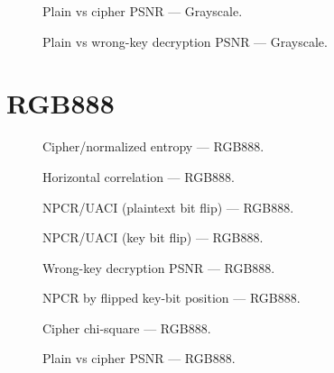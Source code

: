\documentclass{article}
\begin{document}
\begin{figure}[htbp]
  \centering
  
  \caption{Plain vs cipher PSNR --- Grayscale.}
\end{figure}

\begin{figure}[htbp]
  \centering
  
  \caption{Plain vs wrong-key decryption PSNR --- Grayscale.}
\end{figure}

\clearpage

\section{RGB888}
\begin{figure}[htbp]
  \centering
  
  \caption{Cipher/normalized entropy --- RGB888.}
\end{figure}

\begin{figure}[htbp]
  \centering
  
  \caption{Horizontal correlation --- RGB888.}
\end{figure}

\begin{figure}[htbp]
  \centering
  
  \caption{NPCR/UACI (plaintext bit flip) --- RGB888.}
\end{figure}

\begin{figure}[htbp]
  \centering
  
  \caption{NPCR/UACI (key bit flip) --- RGB888.}
\end{figure}

\begin{figure}[htbp]
  \centering
  
  \caption{Wrong-key decryption PSNR --- RGB888.}
\end{figure}

\begin{figure}[htbp]
  \centering
  
  \caption{NPCR by flipped key-bit position --- RGB888.}
\end{figure}

\begin{figure}[htbp]
  \centering
  
  \caption{Cipher chi-square --- RGB888.}
\end{figure}

\begin{figure}[htbp]
  \centering
  
  \caption{Plain vs cipher PSNR --- RGB888.}
\end{figure}
\end{document}
